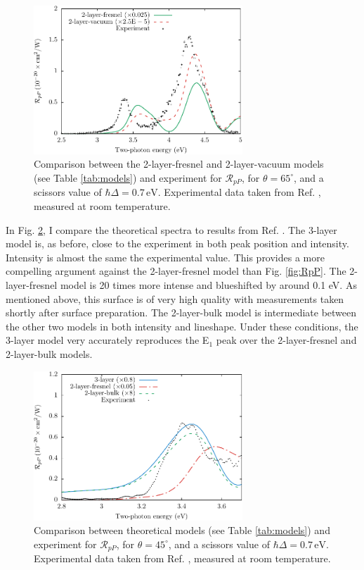 \begin{figure}[H]
\centering 
\includegraphics[width=0.7\textwidth]
{content/figures/fig-Si1x1-Mejia_RpP_models}
\caption{Comparison between the 2-layer-fresnel and 2-layer-vacuum models (see
Table \ref{tab:models}) and experiment for $\mathcal{R}_{pP}$, for
$\theta=65^{\circ}$, and a scissors value of $\hbar\Delta = 0.7\,\text{eV}$.
Experimental data taken from Ref. \cite{mejiaPRB02}, measured at room
temperature.}
\label{fig:othermodels}
\end{figure}

In Fig. \ref{fig:mitchellRpP}, I compare the theoretical spectra to results from
Ref. \cite{mitchellSS01}. The 3-layer model is, as before, close to the
experiment in both peak position and intensity. Intensity is almost the same the
experimental value. This provides a more compelling argument against the
2-layer-fresnel model than Fig. \ref{fig:RpP}. The 2-layer-fresnel model is 20
times more intense and blueshifted by around 0.1 eV. As mentioned above, this
surface is of very high quality with measurements taken shortly after surface
preparation. The 2-layer-bulk model is intermediate between the other two models
in both intensity and lineshape. Under these conditions, the 3-layer model very
accurately reproduces the E$_{1}$ peak over the 2-layer-fresnel and 2-layer-bulk
models.

\begin{figure}[t]
\centering
\includegraphics[width=0.7\textwidth]{content/figures/fig-Si1x1-Mitchell_RpP}
\caption{Comparison between theoretical models (see Table \ref{tab:models}) and
experiment for $\mathcal{R}_{pP}$, for $\theta=45^{\circ}$, and a scissors value
of $\hbar\Delta = 0.7\,\text{eV}$. Experimental data taken from Ref.
\cite{mitchellSS01}, measured at room temperature.}
\label{fig:mitchellRpP}
\end{figure}



